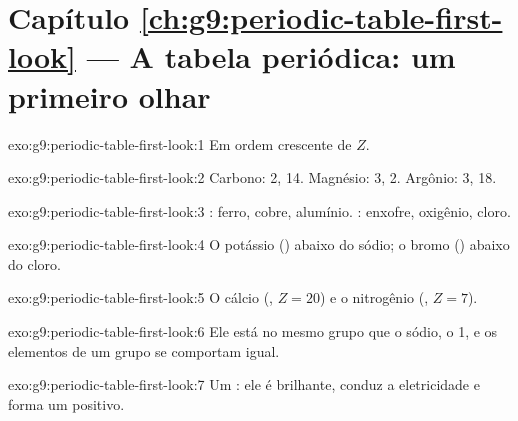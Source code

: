 \section*{Capítulo \ref{ch:g9:periodic-table-first-look} --- A tabela periódica: um primeiro olhar}

\begin{solution}{exo:g9:periodic-table-first-look:1}
Em ordem crescente de  $Z$.
\end{solution}

\begin{solution}{exo:g9:periodic-table-first-look:2}
Carbono:  2,  14. Magnésio:  3,  2. Argônio:
 3,  18.
\end{solution}

\begin{solution}{exo:g9:periodic-table-first-look:3}
: ferro, cobre, alumínio. : enxofre, oxigênio, cloro.
\end{solution}

\begin{solution}{exo:g9:periodic-table-first-look:4}
O potássio () abaixo do sódio; o bromo () abaixo do cloro.
\end{solution}

\begin{solution}{exo:g9:periodic-table-first-look:5}
O cálcio (, $Z = 20$) e o nitrogênio (, $Z = 7$).
\end{solution}

\begin{solution}{exo:g9:periodic-table-first-look:6}
Ele está no mesmo grupo que o sódio, o  1, e os elementos de um
grupo se comportam igual.
\end{solution}

\begin{solution}{exo:g9:periodic-table-first-look:7}
Um : ele é brilhante, conduz a eletricidade e forma um  positivo.
\end{solution}

